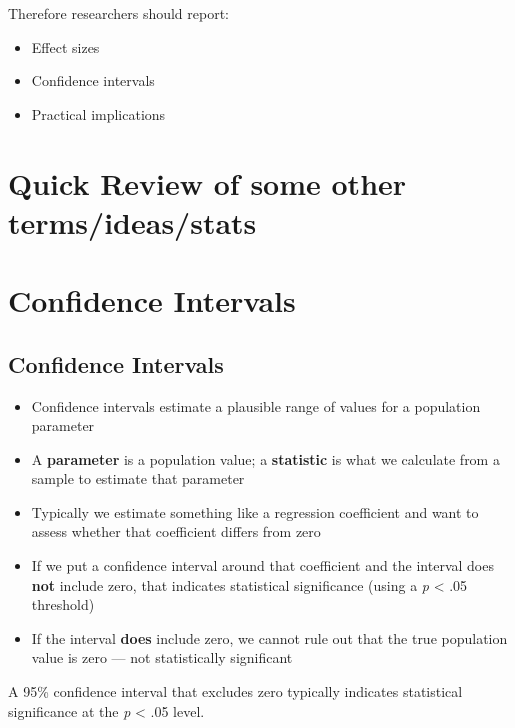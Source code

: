 \documentclass[
  letterpaper,
  DIV=11,
  numbers=noendperiod]{scrreprt}
\providecommand{\tightlist}{%
  \setlength{\itemsep}{0pt}\setlength{\parskip}{0pt}}
\begin{document}
Therefore researchers should report:

\begin{itemize}
\tightlist
\item
  Effect sizes
\item
  Confidence intervals
\item
  Practical implications
\end{itemize}


\chapter{Quick Review of some other
terms/ideas/stats}\label{quick-review-of-some-other-termsideasstats}


\chapter{Confidence Intervals}\label{confidence-intervals}

\section{Confidence Intervals}\label{confidence-intervals-1}

\begin{itemize}
\tightlist
\item
  Confidence intervals estimate a plausible range of values for a
  population parameter
\item
  A \textbf{parameter} is a population value; a \textbf{statistic} is
  what we calculate from a sample to estimate that parameter
\item
  Typically we estimate something like a regression coefficient and want
  to assess whether that coefficient differs from zero
\item
  If we put a confidence interval around that coefficient and the
  interval does \textbf{not} include zero, that indicates statistical
  significance (using a \emph{p} \textless{} .05 threshold)
\item
  If the interval \textbf{does} include zero, we cannot rule out that
  the true population value is zero --- not statistically significant
\end{itemize}

\begin{tcolorbox}[enhanced jigsaw, arc=.35mm, bottomrule=.15mm, bottomtitle=1mm, breakable, colback=white, colbacktitle=quarto-callout-tip-color!10!white, colframe=quarto-callout-tip-color-frame, coltitle=black, left=2mm, leftrule=.75mm, opacityback=0, opacitybacktitle=0.6, rightrule=.15mm, title=\textcolor{quarto-callout-tip-color}{\faLightbulb}\hspace{0.5em}{Rule of Thumb}, titlerule=0mm, toprule=.15mm, toptitle=1mm]

A 95\% confidence interval that excludes zero typically indicates
statistical significance at the \emph{p} \textless{} .05 level.

\end{tcolorbox}
\end{document}
